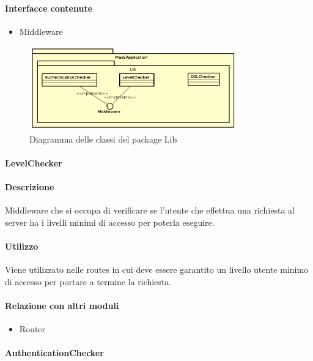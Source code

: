 \paragraph{Interfacce contenute}
\begin{itemize}
\item Middleware
\end{itemize}

\begin{figure}[H]
\centering
\includegraphics[width=0.8\textwidth]{res/sections/backend/lib.png}
\caption{Diagramma delle classi del package Lib}
\end{figure}

\paragraph{LevelChecker}
\paragraph*{Descrizione}
Middleware che si occupa di verificare se l'utente che effettua una richiesta al server ha i livelli minimi di accesso per poterla eseguire.

\paragraph*{Utilizzo}
Viene utilizzato nelle routes in cui deve essere garantito un livello utente minimo di accesso per portare a termine la richiesta.

\paragraph*{Relazione con altri moduli}
\begin{itemize}
\item Router
\end{itemize}

\paragraph{AuthenticationChecker}
